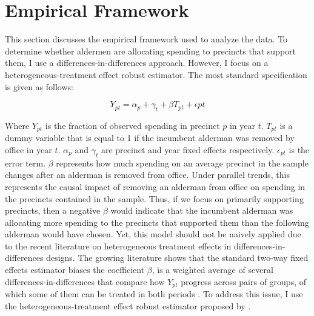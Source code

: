 \section*{Empirical Framework}
This section discusses the empirical framework used to analyze the data.
To determine whether aldermen are allocating spending to precincts that support them, I use a differences-in-differences approach.
However, I focus on a heterogeneous-treatment effect robust estimator.
The most standard specification is given as follows:

\begin{equation}\label{eq:standard_did}
    Y_{pt} = \alpha_{p} + \gamma_{t} + \beta T_{pt} + \epsilon{pt}
\end{equation}

Where $Y_{pt}$ is the fraction of observed spending in precinct $p$ in year $t$. $T_{pt}$ is a dummy variable that is equal to 1 if the incumbent alderman was removed by office in year $t$. $\alpha_{p}$ and $\gamma_{t}$ are precinct and year fixed effects respectively. $\epsilon_{pt}$ is the error term.
$\beta$ represents how much spending on an average precinct in the sample changes after an alderman is removed from office.
Under parallel trends, this represents the causal impact of removing an alderman from office on spending in the precincts contained in the sample.
Thus, if we focus on primarily supporting precincts, then a negative $\beta$ would indicate that the incumbent alderman was allocating more spending to the precincts that supported them than the following alderman would have chosen.
Yet, this model should not be naively applied due to the recent literature on heterogeneous treatment effects in differences-in-differences designs.
The growing literature shows that the standard two-way fixed effects estimator biases the coefficient $\beta$, is a weighted average of several differences-in-differences that compare how $Y_{pt}$ progress across pairs of groups, of which some of them can be treated in both periods \cite{chaisetwfe} \cite{CALLAWAY2021200}. 
To address this issue, I use the heterogeneous-treatment effect robust estimator proposed by \cite{CALLAWAY2021200}.

